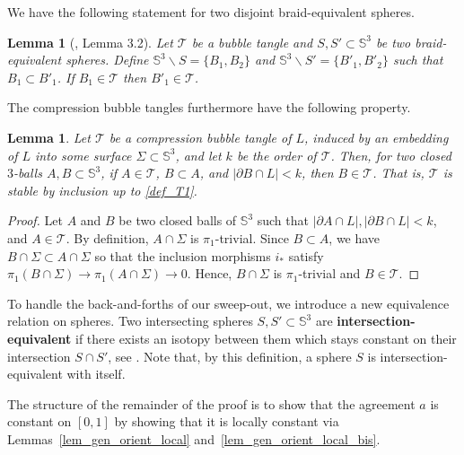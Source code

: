 \documentclass{article}
\newcommand{\Sp}{\mathbb{S}}
\newcommand{\T}{\mathcal{T}}
\newtheorem{lemma}[theorem]{Lemma}
\begin{document}
We have the following statement for two disjoint braid-equivalent spheres. 

\begin{lemma}[\cite{Lunel_spherewidth_out}, Lemma 3.2]\label{lem_braid_equi}
Let $\T$ be a bubble tangle and $S,S' \subset \Sp^3$ be two braid-equivalent spheres. Define $\Sp^3 \smallsetminus S = \{B_1,B_2\}$ and $\Sp^3 \smallsetminus S' = \{B'_1,B'_2\}$ such that $B_1 \subset B'_1$. If $B_1 \in \T$ then $B'_1 \in \T$.
\end{lemma}

The compression bubble tangles furthermore have the following property.

\begin{lemma}\label{lem_bubble_tangle_monot}
Let $\T$ be a compression bubble tangle of $L$, induced by an embedding of $L$ into some surface $\Sigma \subset \Sp^3$, and let $k$ be the order of $\T$. Then, for two closed $3$-balls $A,B \subset \Sp^3$, if $A \in \T$, $B \subset A$, and $|\partial B \cap L| < k$, then $B \in \T$. That is, $\T$ is \emph{stable by inclusion} up to \ref{def_T1}.
\end{lemma}

\begin{proof}
Let $A$ and $B$ be two closed balls of $\Sp^3$ such that $|\partial A \cap L|, |\partial B \cap L| < k$, and $A \in \T$. By definition, $A \cap \Sigma$ is $\pi_1$-trivial. Since $B \subset A $, we have $B \cap \Sigma \subset A \cap \Sigma$ so that the inclusion morphisms $i_*$ satisfy $\pi_1 (B \cap \Sigma) \rightarrow \pi_1 (A \cap \Sigma) \rightarrow 0$. Hence, $B \cap \Sigma$ is $\pi_1$-trivial and $B \in \T$.
\end{proof}

To handle the back-and-forths of our sweep-out, we introduce a new equivalence relation on spheres. Two intersecting spheres $S,S' \subset \Sp^3$ are \textbf{intersection-equivalent} if there exists an isotopy between them which stays constant on their intersection $S \cap S'$, see . Note that, by this definition, a sphere $S$ is intersection-equivalent with itself. 

The structure of the remainder of the proof is to show that the agreement $a$ is constant on $[0,1]$ by showing that it is locally constant via Lemmas~\ref{lem_gen_orient_local} and~\ref{lem_gen_orient_local_bis}.
\end{document}
